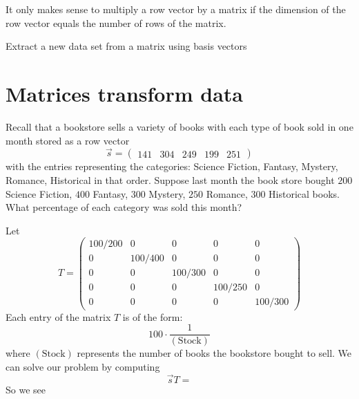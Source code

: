 \documentclass{ximera}
\begin{document}
\begin{warning}
  It only makes sense to multiply a row vector by a matrix if the
  dimension of the row vector equals the number of rows of the
  matrix.
\end{warning}

\begin{example}
Extract a new data set from a matrix using basis vectors
\end{example}


\begin{example}
\end{example}



\section{Matrices transform data}


\begin{example}
  Recall that a bookstore sells a variety of books with each type of
  book sold in one month stored as a row vector
  \[
  \vec{s} = \begin{pmatrix}141 & 304 & 249 & 199 & 251 \end{pmatrix}
  \]
  with the entries representing the categories: Science Fiction,
  Fantasy, Mystery, Romance, Historical in that order.  Suppose last
  month the book store bought $200$ Science Fiction, $400$ Fantasy, $300$
  Mystery, $250$ Romance, $300$ Historical books. What percentage of each
  category was sold this month?
  \begin{explanation}
    Let
    \[
    T =
    \begin{pmatrix}
      100/200 & 0 &    0   &   0    &   0 \\
      0 & 100/400 &    0   &   0    &   0 \\
      0 &   0   &  100/300 &   0    &   0 \\
      0 &   0   &    0   & 100/250  &   0 \\
      0 &   0   &    0   &   0    & 100/300
    \end{pmatrix}
    \]
    Each entry of the matrix $T$ is of the form:
    \[
    100 \cdot \frac{1}{(\text{Stock})}
    \]
    where $(\text{Stock})$ represents the number of books the
    bookstore bought to sell.  We can solve our problem by computing
    \[
    \vec{s} T =
    \]
    So we see
  \end{explanation}

\end{example}
\end{document}
